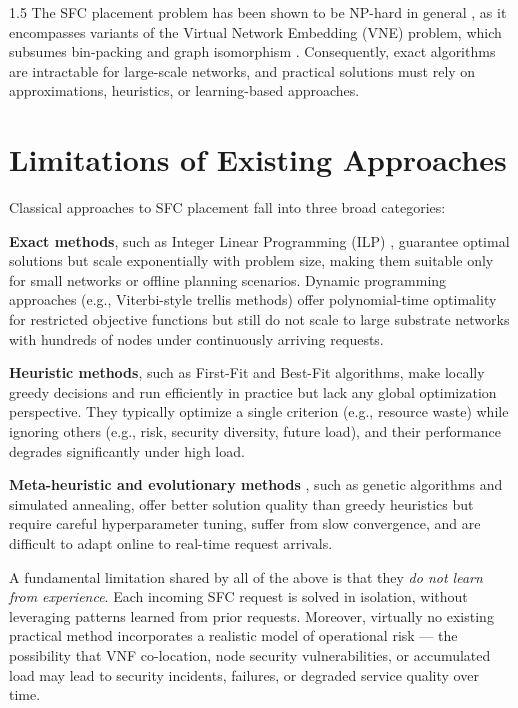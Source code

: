\documentclass[A4paper,12pt]{report}
\theoremstyle{plain}
\theoremstyle{definition}
\theoremstyle{remark}
\numberwithin{equation}{section}
\begin{document}
\begin{spacing}{1.5}
The SFC placement problem has been shown to be NP-hard in general \cite{dolev2013}, as it encompasses variants of the Virtual Network Embedding (VNE) problem, which subsumes bin-packing and graph isomorphism \cite{yu2008}. Consequently, exact algorithms are intractable for large-scale networks, and practical solutions must rely on approximations, heuristics, or learning-based approaches.

\section{Limitations of Existing Approaches}

Classical approaches to SFC placement fall into three broad categories:

\textbf{Exact methods}, such as Integer Linear Programming (ILP) \cite{cohen2015}, guarantee optimal solutions but scale exponentially with problem size, making them suitable only for small networks or offline planning scenarios. Dynamic programming approaches (e.g., Viterbi-style trellis methods) offer polynomial-time optimality for restricted objective functions but still do not scale to large substrate networks with hundreds of nodes under continuously arriving requests.

\textbf{Heuristic methods}, such as First-Fit and Best-Fit algorithms, make locally greedy decisions and run efficiently in practice but lack any global optimization perspective. They typically optimize a single criterion (e.g., resource waste) while ignoring others (e.g., risk, security diversity, future load), and their performance degrades significantly under high load.

\textbf{Meta-heuristic and evolutionary methods} \cite{rankothge2017}, such as genetic algorithms and simulated annealing, offer better solution quality than greedy heuristics but require careful hyperparameter tuning, suffer from slow convergence, and are difficult to adapt online to real-time request arrivals.

A fundamental limitation shared by all of the above is that they \textit{do not learn from experience}. Each incoming SFC request is solved in isolation, without leveraging patterns learned from prior requests. Moreover, virtually no existing practical method incorporates a realistic model of operational risk — the possibility that VNF co-location, node security vulnerabilities, or accumulated load may lead to security incidents, failures, or degraded service quality over time.


\end{spacing}
\end{document}
